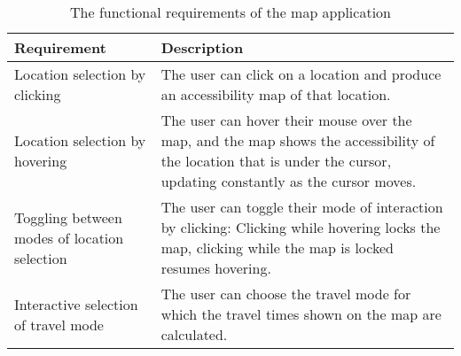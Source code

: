 \begin{table}[H]
	\caption{The functional requirements of the map application}
	\label{tab:functional requirements}
	\centering
	\begin{tabular}{ | L{0.3\textwidth} | L{0.6\textwidth} | }
		\hline
		\textbf{Requirement}
		& \textbf{Description}
		\\
		\hline
		\hline
		Location selection by clicking
		& The user can click on a location and produce an accessibility map of that location.
		\\
		\hline
		Location selection by hovering
		& The user can hover their mouse over the map,
		and the map shows the accessibility of the location that is under the cursor,
		updating constantly as the cursor moves.
		\\
		\hline
		Toggling between modes of location selection
		& The user can toggle their mode of interaction by clicking:
		Clicking while hovering locks the map, clicking while the map is locked resumes hovering.
		\\
		\hline
		Interactive selection of travel mode
		& The user can choose the travel mode for which the travel times shown on the map are calculated.
		\\
		\hline
	\end{tabular}
\end{table}
